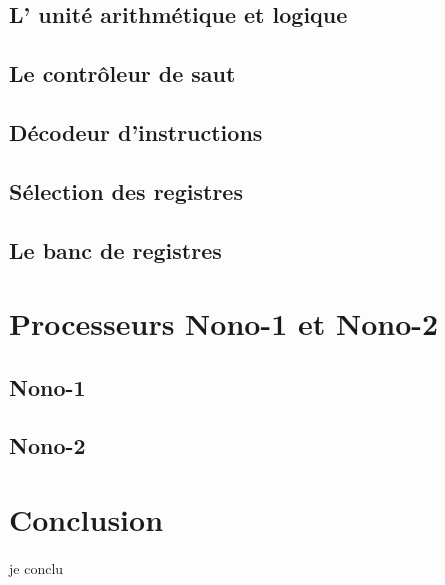\documentclass[a4paper]{article}
\begin{document}
		\subsection{L' unité arithmétique et logique}
			
			
		\subsection{Le contrôleur de saut}
			
			
		\subsection{Décodeur d'instructions}
			
			
		\subsection{Sélection des registres}
			
			
		\subsection{Le banc de registres}
			
	
	\newpage	
	\section{Processeurs Nono-1 et Nono-2}
		\subsection{Nono-1}
		\subsection{Nono-2}
	

	
	
	\newpage
	\section*{Conclusion}
		\paragraph{}{je conclu}
		
\end{document}

